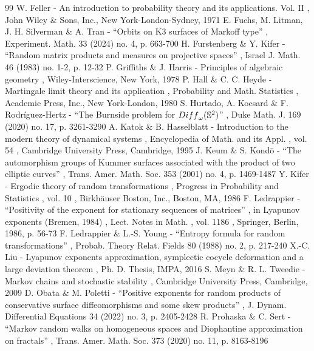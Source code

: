 \documentclass[11pt]{article}
\theoremstyle{plain}
\theoremstyle{definition}
\numberwithin{equation}{section}
\begin{document}
\begin{thebibliography}{99}
 W. Feller - An introduction to probability theory and its applications. Vol. II , John Wiley \& Sons, Inc., New York-London-Sydney, 1971
 E. Fuchs, M. Litman, J. H. Silverman \& A. Tran - “Orbits on K3 surfaces of Markoff type” , Experiment. Math. 33 (2024) no. 4, p. 663-700
 H. Furstenberg \& Y. Kifer - “Random matrix products and measures on projective spaces” , Israel J. Math. 46 (1983) no. 1-2, p. 12-32
 P. Griffiths \& J. Harris - Principles of algebraic geometry , Wiley-Interscience, New York, 1978
 P. Hall \& C. C. Heyde - Martingale limit theory and its application , Probability and Math. Statistics , Academic Press, Inc., New York-London, 1980
 S. Hurtado, A. Kocsard \& F. Rodríguez-Hertz - “The Burnside problem for ${\rm Diff}_{\omega }(\mathbb{S}^2)$” , Duke Math. J. 169 (2020) no. 17, p. 3261-3290
 A. Katok \& B. Hasselblatt - Introduction to the modern theory of dynamical systems , Encyclopedia of Math. and its Appl. , vol. 54 , Cambridge University Press, Cambridge, 1995
 J. Keum \& S. Kondō - “The automorphism groups of Kummer surfaces associated with the product of two elliptic curves” , Trans. Amer. Math. Soc. 353 (2001) no. 4, p. 1469-1487
 Y. Kifer - Ergodic theory of random transformations , Progress in Probability and Statistics , vol. 10 , Birkhäuser Boston, Inc., Boston, MA, 1986
 F. Ledrappier - “Positivity of the exponent for stationary sequences of matrices” , in Lyapunov exponents (Bremen, 1984) , Lect. Notes in Math. , vol. 1186 , Springer, Berlin, 1986, p. 56-73
 F. Ledrappier \& L.-S. Young - “Entropy formula for random transformations” , Probab. Theory Relat. Fields 80 (1988) no. 2, p. 217-240
 X.-C. Liu - Lyapunov exponents approximation, symplectic cocycle deformation and a large deviation theorem , Ph. D. Thesis, IMPA, 2016
 S. Meyn \& R. L. Tweedie - Markov chains and stochastic stability , Cambridge University Press, Cambridge, 2009
 D. Obata \& M. Poletti - “Positive exponents for random products of conservative surface diffeomorphisms and some skew products” , J. Dynam. Differential Equations 34 (2022) no. 3, p. 2405-2428
 R. Prohaska \& C. Sert - “Markov random walks on homogeneous spaces and Diophantine approximation on fractals” , Trans. Amer. Math. Soc. 373 (2020) no. 11, p. 8163-8196

\end{thebibliography}
\end{document}
